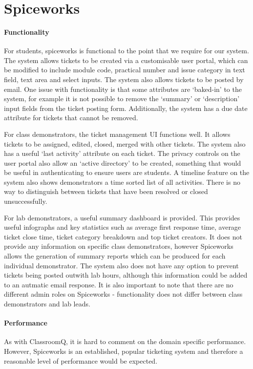 \newpage
\section{Spiceworks}

\paragraph{Functionality}
For students, spiceworks is functional to the point that we require for our system. The system allows tickets to be created via a customisable user portal, which can be modified to include module code, practical number and issue category in text field, text area and select inputs. The system also allows tickets to be posted by email. One issue with functionality is that some attributes are `baked-in' to the system, for example it is not possible to remove the `summary' or `description' input fields from the ticket posting form. Additionally, the system has a due date attribute for tickets that cannot be removed.

For class demonstrators, the ticket management UI functions well. It allows tickets to be assigned, edited, closed, merged with other tickets. The system also has a useful `last activity' attribute on each ticket. The privacy controls on the user portal also allow an `active directory' to be created, something that would be useful in authenticating to ensure users are students. A timeline feature on the system also shows demonstrators a time sorted list of all activities. There is no way to distinguish between tickets that have been resolved or closed unsuccessfully. 

For lab demonstrators, a useful summary dashboard is provided. This provides useful infographs and key statistics such as average first response time, average ticket close time, ticket category breakdown and top ticket creators. It does not provide any information on specific class demonstrators, however Spiceworks allows the generation of summary reports which can be produced for each individual demonstrator. The system also does not have any option to prevent tickets being posted outwith lab hours, although this information could be added to an autmatic email response. It is also important to note that there are no different admin roles on Spiceworks - functionality does not differ between class demonstrators and lab leads.


\paragraph{Performance}
As with ClassroomQ, it is hard to comment on the domain specific performance. However, Spiceworks is an established, popular ticketing system and therefore a reasonable level of performance would be expected. 


